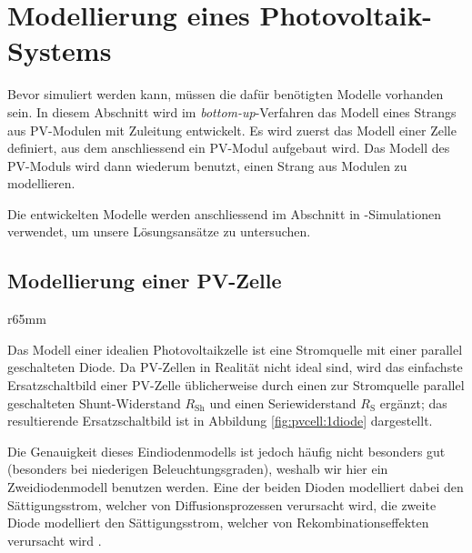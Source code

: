 \chapter{Modellierung eines Photovoltaik-Systems}
\label{chap:models}

Bevor  simuliert  werden  kann,  m\"ussen  die  daf\"ur  ben\"otigten  Modelle
vorhanden  sein. In diesem  Abschnitt wird  im \emph{bottom-up}-Verfahren  das
Modell eines Strangs  aus PV-Modulen mit Zuleitung  entwickelt. Es wird zuerst
das Modell einer Zelle definiert, aus dem anschliessend ein PV-Modul aufgebaut
wird.  Das Modell  des PV-Moduls wird dann wiederum benutzt,  einen Strang aus
Modulen zu modellieren.

Die    entwickelten     Modelle    werden    anschliessend     im    Abschnitt
\emph{} in -Simulationen verwendet, um unsere
L\"osungsans\"atze zu untersuchen.

\section{Modellierung einer PV-Zelle}
\label{sec:simu:model:cell}

\begin{wrapfigure}{r}{65mm}
    \centering
    
    \caption[Eindiodenmodell PV-Zelle]{%
        Eindiodenmodell  einer  PV-Zelle  mit  Stromquelle  $I_{\mathrm{Ph}}$,
        Diode  $D$,  Shunt-Widerstand $R_{\mathrm{Sh}}$~  und  Seriewiderstand
        $R_{\mathrm{S}}$.%
    }
    \label{fig:pvcell:1diode}
\end{wrapfigure}

Das Modell  einer idealien  Photovoltaikzelle ist  eine Stromquelle  mit einer
parallel geschalteten Diode. Da PV-Zellen in Realit\"at nicht ideal sind, wird
das einfachste Ersatzschaltbild einer PV-Zelle \"ublicherweise durch einen zur
Stromquelle parallel geschalteten Shunt-Widerstand $R_{\mathrm{Sh}}$ und einen
Seriewiderstand $R_{\mathrm{S}}$ erg\"anzt; das resultierende Ersatzschaltbild
ist in Abbildung \ref{fig:pvcell:1diode} dargestellt.

Die Genauigkeit  dieses Eindiodenmodells  ist jedoch h\"aufig  nicht besonders
gut  \cite{pvcell:phang}  \cite{pvcell:masmoudi}   (besonders  bei  niederigen
Beleuchtungsgraden),   weshalb   wir   hier  ein   Zweidiodenmodell   benutzen
werden. Eine  der  beiden  Dioden   modelliert  dabei  den  S\"attigungsstrom,
welcher von  Diffusionsprozessen verursacht wird, die  zweite Diode modelliert
den  S\"attigungsstrom,  welcher  von Rekombinationseffekten  verursacht  wird
\cite{pvcell:masmoudi}.

